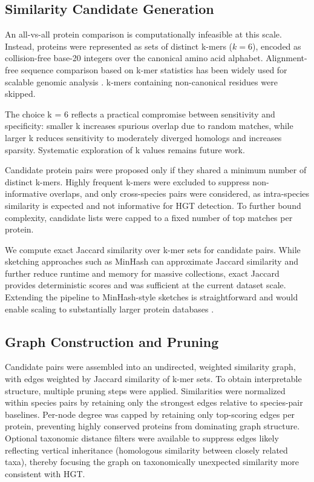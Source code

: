 \documentclass[11pt]{article}
\begin{document}
\subsection{Similarity Candidate Generation}
An all-vs-all protein comparison is computationally infeasible at this scale. Instead, proteins were represented as sets of distinct k-mers ($k=6$), encoded as collision-free base-20 integers over the canonical amino acid alphabet. Alignment-free sequence comparison based on k-mer statistics has been widely used for scalable genomic analysis \cite{Sims2009,Haubold2014}.  k-mers containing non-canonical residues were skipped.

The choice k = 6 reflects a practical compromise between sensitivity and specificity: smaller k increases spurious overlap due to random matches, while larger k reduces sensitivity to moderately diverged homologs and increases sparsity. Systematic exploration of k values remains future work.

Candidate protein pairs were proposed only if they shared a minimum number of distinct k-mers. Highly frequent k-mers were excluded to suppress non-informative overlaps, and only cross-species pairs were considered, as intra-species similarity is expected and not informative for HGT detection. To further bound complexity, candidate lists were capped to a fixed number of top matches per protein.

We compute exact Jaccard similarity over k-mer sets for candidate pairs. While sketching approaches such as MinHash can approximate Jaccard similarity and further reduce runtime and
memory for massive collections, exact Jaccard provides deterministic scores and was sufficient
at the current dataset scale. Extending the pipeline to MinHash-style sketches is straightforward and would enable scaling to substantially larger protein databases \cite{Broder1997,Ondov2016}.

\subsection{Graph Construction and Pruning}
Candidate pairs were assembled into an undirected, weighted similarity graph, with edges weighted by Jaccard similarity of k-mer sets. To obtain interpretable structure, multiple pruning steps were applied. Similarities were normalized within species pairs by retaining only the strongest edges relative to species-pair baselines. Per-node degree was capped by retaining only top-scoring edges per protein, preventing highly conserved proteins from dominating graph structure. Optional taxonomic distance filters were available to suppress edges likely reflecting vertical inheritance (homologous similarity between closely related taxa), thereby focusing the graph on taxonomically unexpected similarity more consistent with HGT.
\end{document}
